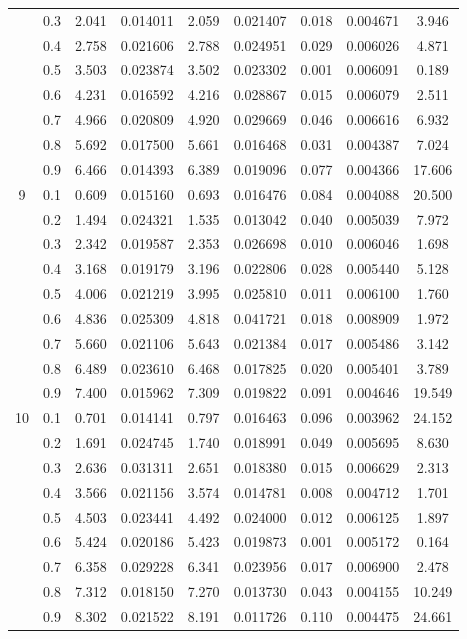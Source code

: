 \begin{longtable}{ | c | c || c | c | c | c | c | c | c | }
 & 0.3 & 2.041 & 0.014011 & 2.059 & 0.021407 & 0.018 & 0.004671 & 3.946 \\
 & 0.4 & 2.758 & 0.021606 & 2.788 & 0.024951 & 0.029 & 0.006026 & 4.871 \\
 & 0.5 & 3.503 & 0.023874 & 3.502 & 0.023302 & 0.001 & 0.006091 & 0.189 \\
 & 0.6 & 4.231 & 0.016592 & 4.216 & 0.028867 & 0.015 & 0.006079 & 2.511 \\
 & 0.7 & 4.966 & 0.020809 & 4.920 & 0.029669 & 0.046 & 0.006616 & 6.932 \\
 & 0.8 & 5.692 & 0.017500 & 5.661 & 0.016468 & 0.031 & 0.004387 & 7.024 \\
 & 0.9 & 6.466 & 0.014393 & 6.389 & 0.019096 & 0.077 & 0.004366 & 17.606 \\
 \hline
\multirow{9}{*}{9} & 0.1 & 0.609 & 0.015160 & 0.693 & 0.016476 & 0.084 & 0.004088 & 20.500 \\
 & 0.2 & 1.494 & 0.024321 & 1.535 & 0.013042 & 0.040 & 0.005039 & 7.972 \\
 & 0.3 & 2.342 & 0.019587 & 2.353 & 0.026698 & 0.010 & 0.006046 & 1.698 \\
 & 0.4 & 3.168 & 0.019179 & 3.196 & 0.022806 & 0.028 & 0.005440 & 5.128 \\
 & 0.5 & 4.006 & 0.021219 & 3.995 & 0.025810 & 0.011 & 0.006100 & 1.760 \\
 & 0.6 & 4.836 & 0.025309 & 4.818 & 0.041721 & 0.018 & 0.008909 & 1.972 \\
 & 0.7 & 5.660 & 0.021106 & 5.643 & 0.021384 & 0.017 & 0.005486 & 3.142 \\
 & 0.8 & 6.489 & 0.023610 & 6.468 & 0.017825 & 0.020 & 0.005401 & 3.789 \\
 & 0.9 & 7.400 & 0.015962 & 7.309 & 0.019822 & 0.091 & 0.004646 & 19.549 \\
 \hline
\multirow{9}{*}{10} & 0.1 & 0.701 & 0.014141 & 0.797 & 0.016463 & 0.096 & 0.003962 & 24.152 \\
 & 0.2 & 1.691 & 0.024745 & 1.740 & 0.018991 & 0.049 & 0.005695 & 8.630 \\
 & 0.3 & 2.636 & 0.031311 & 2.651 & 0.018380 & 0.015 & 0.006629 & 2.313 \\
 & 0.4 & 3.566 & 0.021156 & 3.574 & 0.014781 & 0.008 & 0.004712 & 1.701 \\
 & 0.5 & 4.503 & 0.023441 & 4.492 & 0.024000 & 0.012 & 0.006125 & 1.897 \\
 & 0.6 & 5.424 & 0.020186 & 5.423 & 0.019873 & 0.001 & 0.005172 & 0.164 \\
 & 0.7 & 6.358 & 0.029228 & 6.341 & 0.023956 & 0.017 & 0.006900 & 2.478 \\
 & 0.8 & 7.312 & 0.018150 & 7.270 & 0.013730 & 0.043 & 0.004155 & 10.249 \\
 & 0.9 & 8.302 & 0.021522 & 8.191 & 0.011726 & 0.110 & 0.004475 & 24.661 \\
 \hline
\hline
\end{longtable}
 
